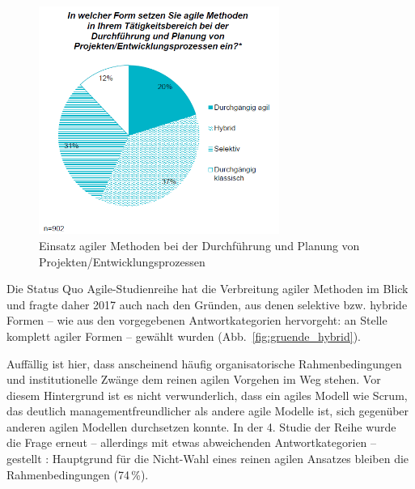 \begin{figure}[h!]
    \centering
    \includegraphics[width=0.7\textwidth]{Bilder/Kapitel-2/EinsatzAgileMethoden.png}
    \caption[Einsatz agiler Methoden bei der Durchführung von Projekten]{Einsatz agiler Methoden bei der Durchführung und Planung von Projekten/Entwicklungsprozessen \cite[15]{kom17}}
    \label{fig:einsatz_agiler_methoden}
\end{figure}

Die Status Quo Agile-Studienreihe hat die Verbreitung agiler Methoden im Blick und fragte daher 2017 auch nach den Gründen, aus denen selektive bzw. hybride Formen – wie aus den vorgegebenen Antwortkategorien hervorgeht: an Stelle komplett agiler Formen – gewählt wurden (Abb.~\ref{fig:gruende_hybrid}). 


Auffällig ist hier, dass anscheinend häufig organisatorische Rahmenbedingungen und institutionelle Zwänge dem reinen agilen Vorgehen im Weg stehen. Vor diesem Hintergrund ist es nicht verwunderlich, dass ein agiles Modell wie Scrum, das deutlich managementfreundlicher als andere agile Modelle ist, sich gegenüber anderen agilen Modellen durchsetzen konnte. In der 4. Studie der Reihe wurde die Frage erneut – allerdings mit etwas abweichenden Antwortkategorien – gestellt \cite[24]{kom20}: Hauptgrund für die Nicht-Wahl eines reinen agilen Ansatzes bleiben die Rahmen\-bedin\-gungen (74\,\%). 

\pagebreak %

